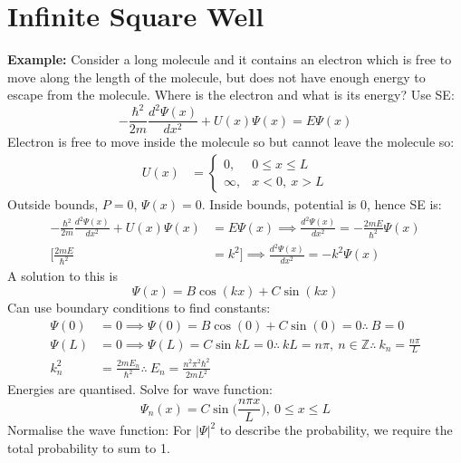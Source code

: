 \documentclass[a4paper, 11pt, normalem]{report}
\begin{document}
\section{Infinite Square Well}
\textbf{Example:}
Consider a long molecule and it contains an electron which is free to move along the length of the molecule, but does not have enough energy to escape from the molecule.
Where is the electron and what is its energy? 
Use SE:
\begin{equation}
     -\frac{\hbar^{2}}{2m}\frac{d^{2} \Psi(x)}{d x^{2}} + U(x)\Psi(x) = E\Psi(x)
\end{equation}
Electron is free to move inside the molecule so but cannot leave the molecule so:
\begin{align}
    U(x) &=
    \begin{cases}
        0,      & 0 \leq x \leq L \\
        \infty, & x < 0,~x > L
    \end{cases}
\end{align}
Outside bounds, $P = 0$, $\Psi(x) = 0$.
Inside bounds, potential is 0, hence SE is:
\begin{align}
    -\frac{\hbar^{2}}{2m}\frac{d^{2} \Psi(x)}{d x^{2}} + U(x)\Psi(x) &= E\Psi(x) \implies \frac{d^{2} \Psi(x)}{d x^{2}} = -\frac{2mE}{\hbar^{2}}\Psi(x) \\
    \Big[\frac{2mE}{\hbar^{2}} &= k^{2}\Big] \implies \frac{d^{2} \Psi(x)}{d x^{2}} = -k^{2}\Psi(x)
\end{align}
A solution to this is
\begin{equation}
    \Psi(x) = B\cos(kx) + C\sin(kx)
\end{equation}
Can use boundary conditions to find constants:
\begin{align}
    \Psi(0) &= 0 \implies \Psi(0) = B\cos(0) + C\sin(0) = 0  \therefore ~ B = 0 \\
    \Psi(L) &= 0 \implies \Psi(L) = C\sin{kL} = 0 \therefore ~ kL = n\pi,~n \in \mathbb{Z} \therefore ~ k_{n} = \frac{n\pi}{L} \\
    k_{n}^{2} &= \frac{2mE_{n}}{\hbar^{2}} \therefore ~ E_{n} = \frac{n^{2}\pi^{2}\hbar^{2}}{2mL^{2}}
\end{align}
Energies are quantised.
Solve for wave function:
\begin{equation}
    \Psi_{n}(x) = C\sin\Big(\frac{n\pi x}{L}\Big),~0 \leq x \leq L
\end{equation}
Normalise the wave function: For $|\Psi|^{2}$ to describe the probability, we require the total probability to sum to 1.
\end{document}
